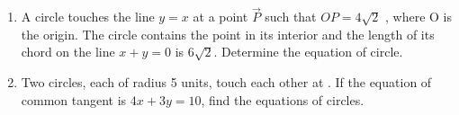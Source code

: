 \documentclass[journal,12pt,twocolumn]{IEEEtran}
\theoremstyle{remark}
\begin{document}
\begin{enumerate}
\hfill{}
\item A circle touches the line $y=x$ at a point $\vec{P}$ such that $OP=4\sqrt{2}$ , where O is the origin. The circle contains the point  in its interior and the length of its chord on the line $x+y=0$ is $6\sqrt{2}$. Determine the equation of circle.
\hfill{}
\item Two circles, each of radius 5 units, touch each other at . If the equation of common tangent is $4x+3y=10$, find the equations of circles.
\hfill{}
\end{enumerate}
\end{document}
